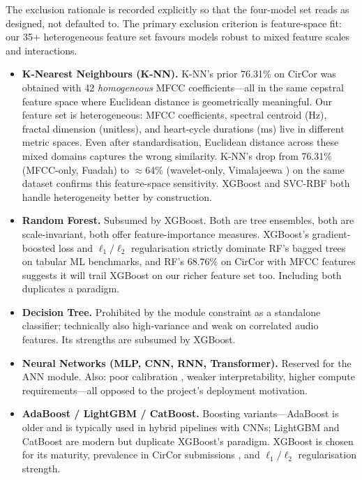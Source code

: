 \documentclass[10pt,twocolumn]{article}
\begin{document}
The exclusion rationale is recorded explicitly so that the four-model set reads as designed, not defaulted to. The primary exclusion criterion is feature-space fit: our 35+ heterogeneous feature set favours models robust to mixed feature scales and interactions.

\begin{itemize}[leftmargin=*,itemsep=0.1em]
    \item \textbf{K-Nearest Neighbours (K-NN).} K-NN's prior 76.31\% on CirCor \citep{fuadah2023} was obtained with 42 \textit{homogeneous} MFCC coefficients---all in the same cepstral feature space where Euclidean distance is geometrically meaningful. Our feature set is heterogeneous: MFCC coefficients, spectral centroid (Hz), fractal dimension (unitless), and heart-cycle durations (ms) live in different metric spaces. Even after standardisation, Euclidean distance across these mixed domains captures the wrong similarity. K-NN's drop from 76.31\% (MFCC-only, Fuadah) to $\approx$64\% (wavelet-only, Vimalajeewa \citep{wavelet2025}) on the same dataset confirms this feature-space sensitivity. XGBoost and SVC-RBF both handle heterogeneity better by construction.
    \item \textbf{Random Forest.} Subsumed by XGBoost. Both are tree ensembles, both are scale-invariant, both offer feature-importance measures. XGBoost's gradient-boosted loss and $\ell_1/\ell_2$ regularisation strictly dominate RF's bagged trees on tabular ML benchmarks, and RF's 68.76\% on CirCor with MFCC features \citep{fuadah2023} suggests it will trail XGBoost on our richer feature set too. Including both duplicates a paradigm.
    \item \textbf{Decision Tree.} Prohibited by the module constraint as a standalone classifier; technically also high-variance and weak on correlated audio features. Its strengths are subsumed by XGBoost.
    \item \textbf{Neural Networks (MLP, CNN, RNN, Transformer).} Reserved for the ANN module. Also: poor calibration \citep{guo2017}, weaker interpretability, higher compute requirements---all opposed to the project's deployment motivation.
    \item \textbf{AdaBoost / LightGBM / CatBoost.} Boosting variants---AdaBoost is older and is typically used in hybrid pipelines with CNNs; LightGBM and CatBoost are modern but duplicate XGBoost's paradigm. XGBoost \citep{chen2016xgboost} is chosen for its maturity, prevalence in CirCor submissions \citep{rohr2024heart2beat, walker2022dbres}, and $\ell_1/\ell_2$ regularisation strength.

\end{itemize}
\end{document}
